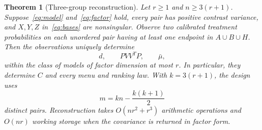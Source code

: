 \documentclass[11pt]{amsart}
\newtheorem{theorem}{Theorem}[section]
\theoremstyle{definition}\newtheorem{example}[theorem]{Example}
\theoremstyle{remark}\newtheorem{remark}[theorem]{Remark}
\begin{document}
\begin{theorem}[Three-group reconstruction]\label{thm:anchors}
Let $r\geq1$ and $n\geq3(r+1)$. Suppose~\eqref{eq:model} and~\eqref{eq:factor} hold, every pair has positive contrast variance, and $X,Y,Z$ in~\eqref{eq:bases} are nonsingular. Observe two calibrated treatment probabilities on each unordered pair having at least one endpoint in $A\cup B\cup H$. Then the observations uniquely determine
\[
 d,\qquad PVV^TP,\qquad \bar\mu,
\]
within the class of models of factor dimension at most $r$. In particular, they determine $C$ and every menu and ranking law. With $k=3(r+1)$, the design uses
\begin{equation}\label{eq:count}
 m=kn-\frac{k(k+1)}2
\end{equation}
distinct pairs. Reconstruction takes $O(nr^2+r^3)$ arithmetic operations and $O(nr)$ working storage when the covariance is returned in factor form.
\end{theorem}
\end{document}
